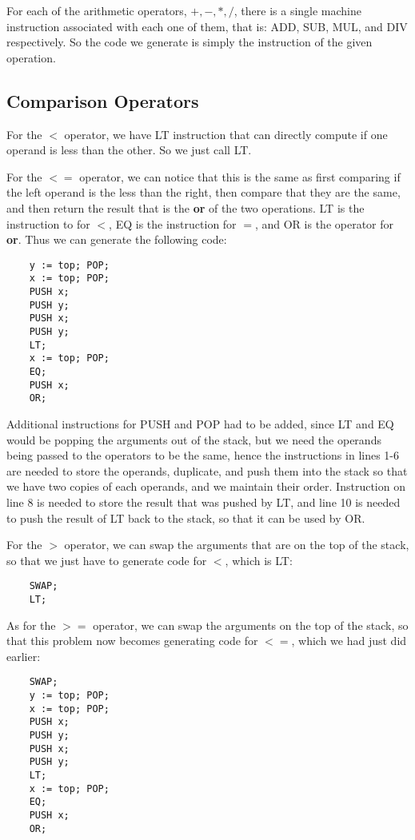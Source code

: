 \documentclass{article}
\begin{document}
For each of the arithmetic operators, $+,-,*,/$, there is a single machine instruction associated with each one of them, that is: ADD, SUB, MUL, and DIV respectively. So the code we generate is simply the instruction of the given operation.

\subsection{Comparison Operators}

For the $<$ operator, we have LT instruction that can directly compute if one operand is less than the other. So we just call LT.

For the $<=$ operator, we can notice that this is the same as first comparing if the left operand is the less than the right, then compare that they are the same, and then return the result that is the \textbf{or} of the two operations. LT is the instruction to for $<$, EQ is the instruction for $=$, and OR is the operator for \textbf{or}. Thus we can generate the following code:

\begin{lstlisting}
    y := top; POP;
    x := top; POP;
    PUSH x;
    PUSH y;
    PUSH x;
    PUSH y;
    LT;
    x := top; POP;
    EQ;
    PUSH x;
    OR;
\end{lstlisting}

Additional instructions for PUSH and POP had to be added, since LT and EQ would be popping the arguments out of the stack, but we need the operands being passed to the operators to be the same, hence the instructions in lines 1-6 are needed to store the operands, duplicate, and push them into the stack so that we have two copies of each operands, and we maintain their order. Instruction on line 8 is needed to store the result that was pushed by LT, and line 10 is needed to push the result of LT back to the stack, so that it can be used by OR.

For the $>$ operator, we can swap the arguments that are on the top of the stack, so that we just have to generate code for $<$, which is LT:

\begin{lstlisting}
    SWAP;
    LT;
\end{lstlisting}

As for the $>=$ operator, we can swap the arguments on the top of the stack, so that this problem now becomes generating code for $<=$, which we had just did earlier:

\begin{lstlisting}
    SWAP;
    y := top; POP;
    x := top; POP;
    PUSH x;
    PUSH y;
    PUSH x;
    PUSH y;
    LT;
    x := top; POP;
    EQ;
    PUSH x;
    OR;
\end{lstlisting}
\end{document}
